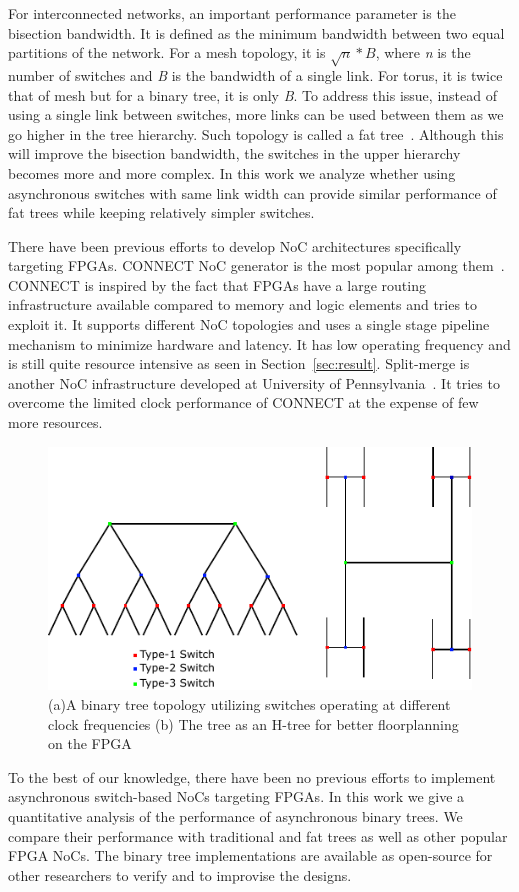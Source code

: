 For interconnected networks, an important performance parameter is the bisection bandwidth.
It is defined as the minimum bandwidth between two equal partitions of the network.
For a mesh topology, it is $\sqrt{n}*B$, where \emph{n} is the number of switches and \emph{B} is the bandwidth of a single link.
For torus, it is twice that of mesh but for a binary tree, it is only \emph{B}.
To address this issue, instead of using a single link between switches, more links can be used between them as we go higher in the tree hierarchy.
Such topology is called a fat tree~\cite{Leiserson1985}. 
Although this will improve the bisection bandwidth, the switches in the upper hierarchy becomes more and more complex.
In this work we analyze whether using asynchronous switches with same link width can provide similar performance of fat trees while keeping relatively simpler switches.

There have been previous efforts to develop NoC architectures specifically targeting FPGAs.
CONNECT NoC generator is the most popular among them~\cite{papa_connect_fpga2012}.
CONNECT is inspired by the fact that FPGAs have a large routing infrastructure available compared to memory and logic elements and tries to exploit it. 
It supports different NoC topologies and uses a single stage pipeline mechanism  to minimize hardware and latency. 
It has low operating frequency and is still quite resource intensive as seen in Section~\ref{sec:result}. 
Split-merge is another NoC infrastructure developed at University of Pennsylvania~\cite{Huan2012}.
It tries to overcome the limited clock performance of CONNECT at the expense of few more resources.

\begin{figure}[t]
\centering
   \includegraphics[width=\columnwidth]{Figures/HNoC.pdf}
   \caption{(a)A binary tree topology utilizing switches operating at different clock frequencies (b) The tree as an H-tree for better floorplanning on the FPGA}
   \label{fig:btree}
\end{figure}


To the best of our knowledge, there have been no previous efforts to implement asynchronous switch-based NoCs targeting FPGAs. 
In this work we give a quantitative analysis of the performance of asynchronous binary trees.
We compare their performance with traditional and fat trees as well as other popular FPGA NoCs.
The binary tree implementations are available as open-source for other researchers to verify and to improvise the designs.